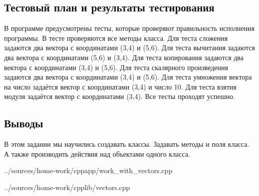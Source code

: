 \documentclass[12pt,a4paper]{report}
\begin{document}
\subsection{Тестовый план и результаты тестирования}
В программе предусмотрены тесты, которые проверяют правильность исполнения программы. В тесте проверяются все методы класса. Для теста сложения задаются два вектора с координатами (3,4) и (5,6). Для теста вычитания задаются два вектора с координатами (5,6) и (3,4). Для теста копирования задаются два вектора с координатами (3,4) и (5,6). Для теста скалярного произведения задаются два вектора с координатами (3,4) и (5,6). Для теста умножения вектора на число задаётся вектор с координатами (3,4) и число 10. Для теста взятия модуля задаётся вектор с координатами (3,4). Все тесты проходят успешно.
\subsection{Выводы}
В этом задании мы научились создавать классы. Задавать методы и поля класса. А также производить действия над объектами одного класса.

{../sources/home-work/cppapp/work_with_vectors.cpp}


{../sources/home-work/cpplib/vectors.cpp}
\end{document}
